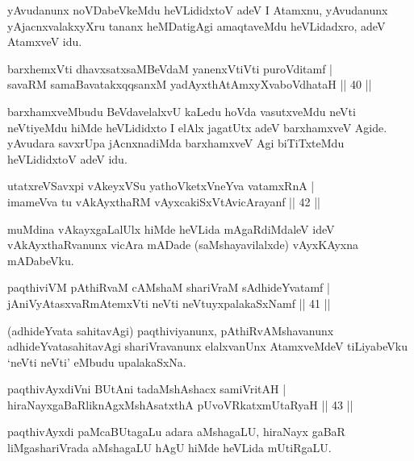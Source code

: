 \begin{artha}
yAvudanunx noVDabeVkeMdu heVLididxtoV adeV I Atamxnu, yAvudanunx yAjacnxvalakxyXru tananx heMDatigAgi amaqtaveMdu heVLidadxro, adeV AtamxveV idu.
\end{artha}


\begin{shl}
barxhemxVti dhavxsatxsaMBeVdaM yanenxVtiVti puroVditamf |\\
savaRM samaBavatakxqqsanxM yadAyxthAtAmxyXvaboVdhataH \hfill || 40 ||
\end{shl}

\begin{artha}
barxhamxveMbudu BeVdavelalxvU kaLedu hoVda vasutxveMdu neVti neVtiyeMdu hiMde heVLididxto I elAlx jagatUtx adeV barxhamxveV Agide. yAvudara savxrUpa jAcnxnadiMda barxhamxveV Agi biTiTxteMdu heVLididxtoV adeV idu.
\end{artha}

\begin{shl}
utatxreVSavxpi vAkeyxVSu yathoVketxVneYva vatamxRnA |\\
imameVva tu vAkAyxthaRM vAyxcakiSxVtAvicArayanf \hfill || 42 ||
\end{shl}

\begin{artha}
muMdina vAkayxgaLalUlx hiMde heVLida mAgaRdiMdaleV ideV vAkAyxthaRvanunx vicAra mADade (saMshayavilalxde) vAyxKAyxna mADabeVku.
\end{artha}

\begin{shl}
paqthiviVM pAthiRvaM cAMshaM shariVraM sAdhideYvatamf |\\
jAniVyAtasxvaRmAtemxVti neVti neVtuyxpalakaSxNamf \hfill || 41 ||
\end{shl}

\begin{artha}
(adhideYvata sahitavAgi) paqthiviyanunx, pAthiRvAMshavanunx adhideYvatasahitavAgi shariVravanunx elalxvanUnx AtamxveMdeV   tiLiyabeVku `neVti neVti' eMbudu upalakaSxNa.
\end{artha}

\begin{shl}
paqthivAyxdiVni BUtAni tadaMshAshacx samiVritAH |\\
hiraNayxgaBaRliknAgxMshAsatxthA pUvoVRkatxmUtaRyaH \hfill || 43 ||
\end{shl}

\begin{artha}
paqthivAyxdi paMcaBUtagaLu adara aMshagaLU, hiraNayx gaBaR liMgashariVrada aMshagaLU hAgU hiMde heVLida mUtiRgaLU.
\end{artha}

